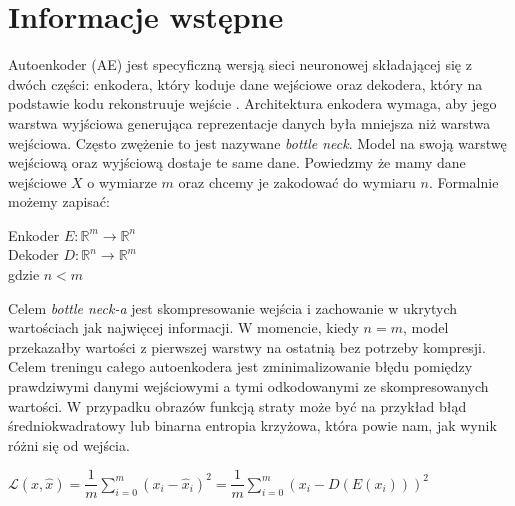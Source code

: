 \documentclass[a4paper,12pt,oneside]{book} %
\begin{document}
\section{Informacje wstępne}
Autoenkoder (AE) jest specyficzną wersją sieci neuronowej składającej się z dwóch części: enkodera, który koduje dane wejściowe oraz dekodera, który na podstawie kodu rekonstruuje wejście \cite{bank2021autoencoders}. Architektura enkodera wymaga, aby jego warstwa wyjściowa generująca reprezentacje danych była mniejsza niż warstwa wejściowa. Często zwężenie to jest nazywane \textit{bottle neck}. Model na swoją warstwę wejściową oraz wyjściową dostaje te same dane. Powiedzmy że mamy dane wejściowe $X$ o wymiarze $m$ oraz chcemy je zakodować do wymiaru $n$. Formalnie możemy zapisać:\\
\begin{center}
	Enkoder $E: \mathbb{R}^m \rightarrow \mathbb{R}^n$\\
	Dekoder $D: \mathbb{R}^n \rightarrow \mathbb{R}^m$ \\
	gdzie $n < m$\\
\end{center}
Celem \textit{bottle neck-a} jest skompresowanie wejścia i zachowanie w ukrytych wartościach jak najwięcej informacji. W momencie, kiedy $n = m$, model przekazałby wartości z pierwszej warstwy na ostatnią bez potrzeby kompresji. Celem treningu całego autoenkodera jest zminimalizowanie błędu pomiędzy prawdziwymi danymi wejściowymi a tymi odkodowanymi ze skompresowanych wartości. W przypadku obrazów funkcją straty może być na przykład błąd średniokwadratowy lub binarna entropia krzyżowa, która powie nam, jak wynik różni się od wejścia. 
 \begin{center}
 		$\mathcal{L}(x, \hat{x}) = \dfrac{1}{m}\displaystyle\sum_{i=0}^{m}(x_i-\hat{x}_i)^2 = \dfrac{1}{m}\displaystyle\sum_{i=0}^{m}(x_i-D(E(x_i)))^2$
 \end{center}
\end{document}
